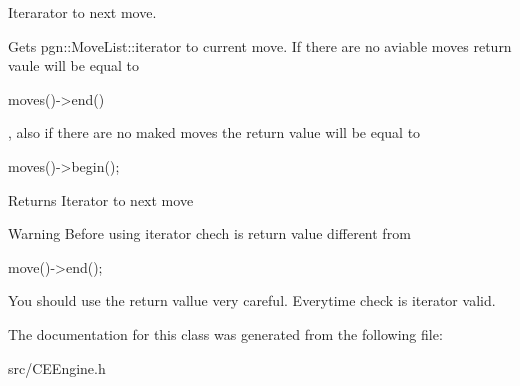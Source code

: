 Iterarator to next move. 

Gets pgn::MoveList::iterator to current move. If there are no aviable moves return vaule will be equal to 
\begin{DoxyCode}
 moves()->end()
\end{DoxyCode}
, also if there are no maked moves the return value will be equal to 
\begin{DoxyCode}
 moves()->begin(); 
\end{DoxyCode}
 \begin{DoxyReturn}{Returns}
Iterator to next move 
\end{DoxyReturn}
\begin{DoxyWarning}{Warning}
Before using iterator chech is return value different from 
\begin{DoxyCode}
 move()->end(); 
\end{DoxyCode}
 

You should use the return vallue very careful. Everytime check is iterator valid. 
\end{DoxyWarning}


The documentation for this class was generated from the following file:\begin{DoxyCompactItemize}
\item 
src/CEEngine.h\end{DoxyCompactItemize}
